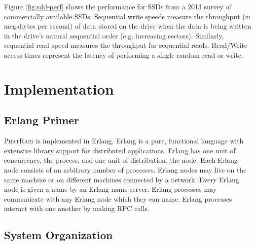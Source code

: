 \documentclass[10pt,letter]{article}
\newcommand{\phatraid}[0]{\textsc{PhatRaid}}
\begin{document}
Figure \ref{fig:sdd-perf} shows the performance for SSDs from a 2013 survey of commercially available SSDs. Sequential write speeds measure the throughput (in megabytes per second) of data stored on the drive when the data is being written in the drive's natural sequential order (e.g. increasing sectors). Similarly, sequential read speed measures the throughput for sequential reads. Read/Write access times represent the latency of performing a single random read or write. 

\section{Implementation}

\subsection{Erlang Primer}

\phatraid{} is implemented in Erlang. Erlang is a pure, functional language with
extensive library support for distributed applications. Erlang has one unit of
concurrency, the process, and one unit of distribution, the node. Each Erlang
node consists of an arbitrary number of processes. Erlang nodes may live on the
same machine or on different machines connected by a network. Every Erlang node
is given a name by an Erlang name server. Erlang processes may communicate with
any Erlang node which they can name. Erlang processes interact with one another
by making RPC calls.

\subsection{System Organization}
\end{document}
